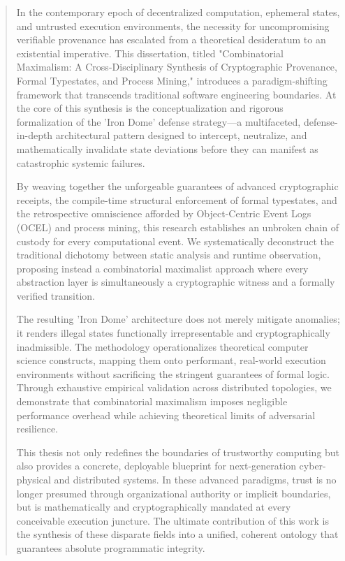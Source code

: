 \begin{abstract}
In the contemporary epoch of decentralized computation, ephemeral states, and untrusted execution environments, the necessity for uncompromising verifiable provenance has escalated from a theoretical desideratum to an existential imperative. This dissertation, titled "Combinatorial Maximalism: A Cross-Disciplinary Synthesis of Cryptographic Provenance, Formal Typestates, and Process Mining," introduces a paradigm-shifting framework that transcends traditional software engineering boundaries. At the core of this synthesis is the conceptualization and rigorous formalization of the 'Iron Dome' defense strategy---a multifaceted, defense-in-depth architectural pattern designed to intercept, neutralize, and mathematically invalidate state deviations before they can manifest as catastrophic systemic failures. 

By weaving together the unforgeable guarantees of advanced cryptographic receipts, the compile-time structural enforcement of formal typestates, and the retrospective omniscience afforded by Object-Centric Event Logs (OCEL) and process mining, this research establishes an unbroken chain of custody for every computational event. We systematically deconstruct the traditional dichotomy between static analysis and runtime observation, proposing instead a combinatorial maximalist approach where every abstraction layer is simultaneously a cryptographic witness and a formally verified transition. 

The resulting 'Iron Dome' architecture does not merely mitigate anomalies; it renders illegal states functionally irrepresentable and cryptographically inadmissible. The methodology operationalizes theoretical computer science constructs, mapping them onto performant, real-world execution environments without sacrificing the stringent guarantees of formal logic. Through exhaustive empirical validation across distributed topologies, we demonstrate that combinatorial maximalism imposes negligible performance overhead while achieving theoretical limits of adversarial resilience. 

This thesis not only redefines the boundaries of trustworthy computing but also provides a concrete, deployable blueprint for next-generation cyber-physical and distributed systems. In these advanced paradigms, trust is no longer presumed through organizational authority or implicit boundaries, but is mathematically and cryptographically mandated at every conceivable execution juncture. The ultimate contribution of this work is the synthesis of these disparate fields into a unified, coherent ontology that guarantees absolute programmatic integrity.
\end{abstract}

